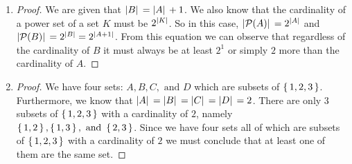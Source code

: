 \documentclass[12pt]{article}
\begin{document}
\begin{enumerate}[label=1.\arabic*]
\begin{enumerate}[label=(\alph*)]
\begin{proof}
              Since the cardinality of a set must be a nonzero positive integer we know that the smallest possible
              cardinality for $\mathcal{P}\qty(B)$ is $3$. However, we also know that the cardinality of a power set
              $\mathcal{P}\qty(K)$ must be $2^{\abs*{K}}$ for some set $K$. Thus, the cardinality
              of $\mathcal{P}\qty(B)$ cannot be $3$ (the next largest integer after $2$; which is $\abs*{A}$) because
              $\log_2{3}$ is not an integer. However, it \emph{can} be $4$. So the smallest possible cardinality
              of $\mathcal{P}\qty(B)=4$. Since $\abs*{\mathcal{P}\qty(B)} < \abs*{C}$ the smallest possible cardinality of
              $C=5$.
              \end{proof}
        \item
              \begin{proof}
                We are given that $\abs*{B}=\abs*{A}+1$. We also know that the cardinality of a power set of
                a set $K$ must be $2^{\abs*{K}}$. So in this case, $\abs*{\mathcal{P}\qty(A)}=2^{\abs*{A}}$ and
                $\abs*{\mathcal{P}\qty(B)}=2^{\abs*{B}}=2^{\abs*{A+1}}$. From this equation we can observe that regardless
                of the cardinality of $B$ it must always be at least $2^1$ or simply $2$ more than the cardinality of $A$.
              \end{proof}
        \item
              \begin{proof}
                We have four sets: $A, B, C, \text{ and } D$ which are subsets of $\set{1,2,3}$. Furthermore,
                we know that $\abs*{A}=\abs*{B}=\abs*{C}=\abs*{D}=2$. There are only $3$ subsets of $\set{1,2,3}$ with
                a cardinality of $2$, namely $\set{1,2},\set{1,3}, \text{ and } \set{2,3}$. Since we have four sets all of which
                are subsets of $\set{1,2,3}$ with a cardinality of $2$ we must conclude that at least one of them are the same set.
              \end{proof}
      \end{enumerate}


\end{enumerate}
\end{document}
